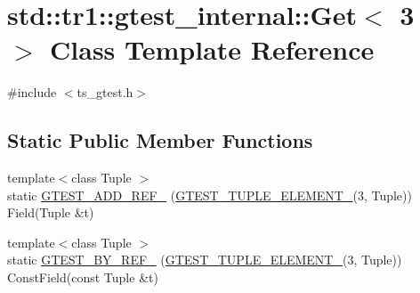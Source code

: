 \hypertarget{classstd_1_1tr1_1_1gtest__internal_1_1Get_3_013_01_4}{\section{std\-:\-:tr1\-:\-:gtest\-\_\-internal\-:\-:Get$<$ 3 $>$ Class Template Reference}
\label{classstd_1_1tr1_1_1gtest__internal_1_1Get_3_013_01_4}
}


{\ttfamily \#include $<$ts\-\_\-gtest.\-h$>$}

\subsection*{Static Public Member Functions}
\begin{DoxyCompactItemize}
\item 
{\footnotesize template$<$class Tuple $>$ }\\static \hyperlink{classstd_1_1tr1_1_1gtest__internal_1_1Get_3_013_01_4_aa2ebd71eca812f06bad0773a7e2f6788}{G\-T\-E\-S\-T\-\_\-\-A\-D\-D\-\_\-\-R\-E\-F\-\_\-} (\hyperlink{ts__gtest_8h_a1b7f133d8aa02e0b7afed7b66781eeb7}{G\-T\-E\-S\-T\-\_\-\-T\-U\-P\-L\-E\-\_\-\-E\-L\-E\-M\-E\-N\-T\-\_\-}(3, Tuple)) Field(Tuple \&t)
\item 
{\footnotesize template$<$class Tuple $>$ }\\static \hyperlink{classstd_1_1tr1_1_1gtest__internal_1_1Get_3_013_01_4_ab8c5283e6776308abc41aaad518a23c7}{G\-T\-E\-S\-T\-\_\-\-B\-Y\-\_\-\-R\-E\-F\-\_\-} (\hyperlink{ts__gtest_8h_a1b7f133d8aa02e0b7afed7b66781eeb7}{G\-T\-E\-S\-T\-\_\-\-T\-U\-P\-L\-E\-\_\-\-E\-L\-E\-M\-E\-N\-T\-\_\-}(3, Tuple)) Const\-Field(const Tuple \&t)
\end{DoxyCompactItemize}


